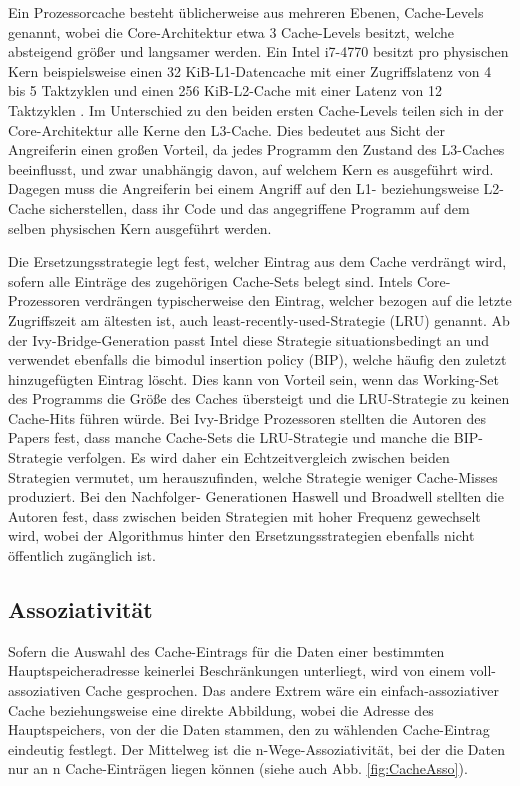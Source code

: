 Ein Prozessorcache besteht üblicherweise aus mehreren Ebenen, Cache-Levels genannt, wobei die Core-Architektur etwa 3 Cache-Levels besitzt, welche absteigend größer und langsamer werden. Ein Intel i7-4770 besitzt pro physischen Kern beispielsweise einen 32 KiB-L1-Datencache mit einer Zugriffslatenz von 4 bis 5 Taktzyklen und einen 256 KiB-L2-Cache mit einer Latenz von 12 Taktzyklen \cite{CacheStatsHaswell}.
Im Unterschied zu den beiden ersten Cache-Levels teilen sich in der Core-Architektur alle Kerne den L3-Cache. 
Dies bedeutet aus Sicht der Angreiferin einen großen Vorteil, da jedes Programm den Zustand des L3-Caches beeinflusst, und zwar unabhängig davon, auf welchem Kern es ausgeführt wird.
Dagegen muss die Angreiferin bei einem Angriff auf den L1- beziehungsweise L2-Cache sicherstellen, dass ihr Code und das angegriffene Programm auf dem selben physischen Kern ausgeführt werden.

Die Ersetzungsstrategie legt fest, welcher Eintrag aus dem Cache verdrängt wird, sofern alle Einträge des zugehörigen Cache-Sets belegt sind. 
Intels Core-Prozessoren verdrängen typischerweise den Eintrag, welcher bezogen auf die letzte Zugriffszeit am ältesten ist, auch least-recently-used-Strategie (LRU) genannt. 
Ab der Ivy-Bridge-Generation passt Intel diese Strategie situationsbedingt an \cite{CacheReplacementPolicy} und verwendet ebenfalls  die bimodul insertion policy (BIP), welche häufig den zuletzt hinzugefügten Eintrag löscht. 
Dies kann von Vorteil sein, wenn das Working-Set des Programms die Größe des Caches übersteigt und die LRU-Strategie zu keinen Cache-Hits führen würde.
Bei Ivy-Bridge Prozessoren stellten die Autoren des Papers fest, dass manche Cache-Sets die LRU-Strategie und manche die BIP-Strategie verfolgen. 
Es wird daher ein Echtzeitvergleich zwischen beiden Strategien vermutet, um herauszufinden, welche Strategie weniger Cache-Misses produziert. 
Bei den Nachfolger- Generationen Haswell und Broadwell stellten die Autoren fest, dass zwischen beiden Strategien mit hoher Frequenz gewechselt wird, wobei der Algorithmus hinter den Ersetzungsstrategien ebenfalls nicht öffentlich zugänglich ist.

\subsection{Assoziativität}


Sofern die Auswahl des Cache-Eintrags für die Daten einer bestimmten Hauptspeicheradresse keinerlei Beschränkungen unterliegt, wird von einem voll-assoziativen Cache gesprochen. 
Das andere Extrem wäre ein einfach-assoziativer Cache beziehungsweise eine direkte Abbildung, wobei die Adresse des Hauptspeichers, von der die Daten stammen, den zu wählenden Cache-Eintrag eindeutig festlegt.
Der Mittelweg ist die n-Wege-Assoziativität, bei der die Daten nur an n Cache-Einträgen liegen können (siehe auch Abb. \ref{fig:CacheAsso}).


